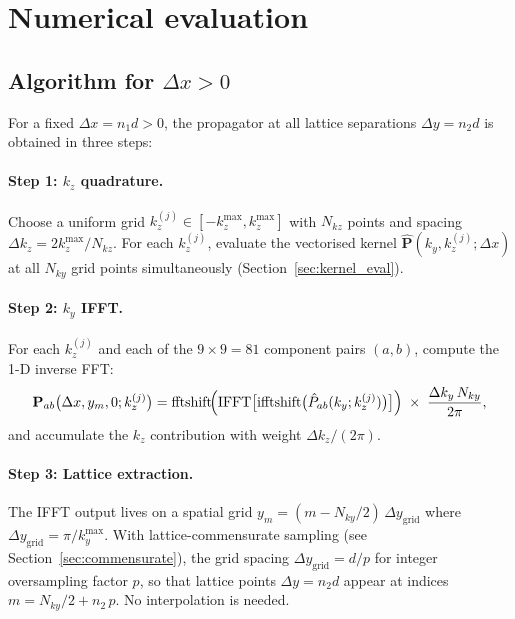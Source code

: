 \documentclass[11pt,a4paper]{article}
\newcommand{\bP}{\mathbf{P}}
\begin{document}
\section{Numerical evaluation}\label{sec:evaluation}

\subsection{Algorithm for \texorpdfstring{$\Delta x > 0$}{Δx > 0}}
\label{sec:alg_dx_pos}

For a fixed $\Delta x = n_1 d > 0$, the propagator at all
lattice separations $\Delta y = n_2 d$ is obtained in three
steps:

\paragraph{Step 1: $k_z$ quadrature.}
Choose a uniform grid $k_z^{(j)} \in [-k_z^{\max}, k_z^{\max}]$
with $N_{kz}$ points and spacing
$\Delta k_z = 2k_z^{\max}/N_{kz}$.
For each $k_z^{(j)}$, evaluate the vectorised kernel
$\hat{\bP}(k_y, k_z^{(j)}; \Delta x)$ at all $N_{ky}$ grid
points simultaneously (Section~\ref{sec:kernel_eval}).

\paragraph{Step 2: $k_y$ IFFT.}
For each $k_z^{(j)}$ and each of the $9\times 9 = 81$
component pairs $(a,b)$, compute the 1-D inverse FFT:
\[
  \bP_{ab}\bigl(\Delta x, y_m, 0; k_z^{(j)}\bigr)
  = \text{fftshift}\!\Bigl(
      \text{IFFT}\bigl[\text{ifftshift}
      \bigl(\hat{P}_{ab}(k_y; k_z^{(j)})\bigr)
    \bigr]\Bigr)
  \;\times\;\frac{\Delta k_y\,N_{ky}}{2\pi},
\]
and accumulate the $k_z$ contribution with weight
$\Delta k_z/(2\pi)$.

\paragraph{Step 3: Lattice extraction.}
The IFFT output lives on a spatial grid
$y_m = (m - N_{ky}/2)\,\Delta y_{\text{grid}}$
where $\Delta y_{\text{grid}} = \pi / k_y^{\max}$.
With lattice-commensurate sampling (see
Section~\ref{sec:commensurate}), the grid spacing
$\Delta y_{\text{grid}} = d/p$ for integer oversampling
factor $p$, so that lattice points $\Delta y = n_2 d$
appear at indices $m = N_{ky}/2 + n_2\,p$.
No interpolation is needed.
\end{document}
